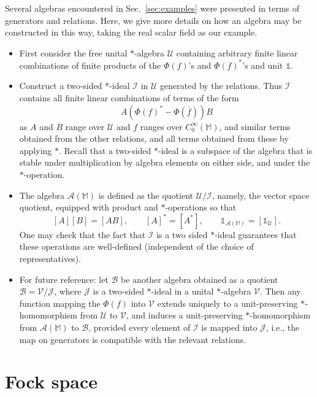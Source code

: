 \documentclass[12pt]{article}
\newcommand{\1}{\mathds{1}}                         %
\newcommand{\MM}{\mathbb{M}}
\newcommand{\II}{{\mathbb{1}}}
\newcommand{\Ac}{{\mathcal{A}}}
\newcommand{\Bc}{{\mathcal{B}}}
\newcommand{\Ic}{{\mathcal{I}}}
\newcommand{\Jc}{{\mathcal{J}}}
\newcommand{\Uc}{{\mathcal{U}}}
\newcommand{\Vc}{{\mathcal{V}}}
\newcommand{\CoinX}[1]{C_0^\infty(#1)}
\begin{document}
Several algebras encountered in Sec.~\ref{sec:examples} were presented in terms of generators and relations. Here, we give more details on how an algebra may be constructed in this way, taking the real scalar field as our example. 
		\begin{itemize}
			\item First consider the free unital $*$-algebra $\Uc$ containing arbitrary finite linear combinations of finite products of the $\Phi(f)$'s and $\Phi(f)^*$'s and unit $\II$.
			\item Construct a two-sided $*$-ideal $\Ic$ in $\Uc$ generated by the relations. 
			Thus $\mathcal{I}$ contains all finite linear combinations of terms of the form
			\[
			A(\Phi(f)^*-\Phi(\overline{f}))B 
			\] 
			as $A$ and $B$ range over $\Uc$ and $f$ ranges over $\CoinX{\MM}$, and similar terms obtained from the other relations, and all terms obtained from these by applying $*$. Recall that a two-sided $*$-ideal is a subspace of the algebra that is stable under multiplication by algebra elements on either side, and under the $*$-operation.
			\item The algebra $\Ac(\MM)$ is defined as the quotient $\Uc/\Ic$, namely, the vector space quotient, equipped with product and $*$-operations so that
			\[ 
			[A] [B]= [AB],\qquad [A]^*=[A^*], \qquad \II_{\Ac(\MM)} = [\II_\Uc].
			\]
			One may check that the fact that $\Ic$ is a two sided $*$-ideal guarantees that these operations are well-defined (independent of the choice of representatives).
			
			\item For future reference: let $\Bc$ be another algebra obtained as a quotient $\Bc=\Vc/\Jc$, where $\Jc$ is a two-sided $*$-ideal in a unital $*$-algebra $\Vc$. Then
			any function mapping the $\Phi(f)$ into $\Vc$ extends uniquely to a unit-preserving $*$-homomorphism from $\Uc$ to $\Vc$, and induces a unit-preserving $*$-homomorphism from $\Ac(\MM)$ to $\Bc$, provided every element of $\Ic$ is mapped into $\Jc$, i.e., the map on generators is compatible with the relevant relations.
		\end{itemize}

\section{Fock space}\label{sec:Fock}
\end{document}
